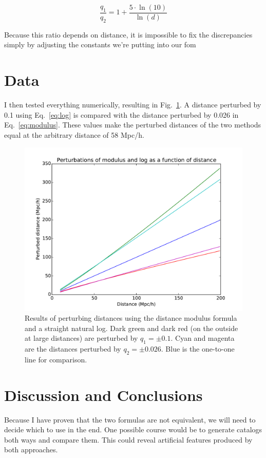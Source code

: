 \documentclass[usenatbib]{mn2e}
\begin{document}
\[
\frac{q_1}{q_2} = 1 + \frac{5\cdot\ln\left(10\right)}{\ln\left(d\right)}
\]

Because this ratio depends on distance, it is impossible to fix the discrepancies simply by adjusting the constants we're putting into our fom



\section{Data}
I then tested everything numerically, resulting in Fig.~\ref{fig:distances}. A distance perturbed by 0.1 using Eq.~\ref{eq:log} is compared with the distance perturbed by 0.026 in Eq.~\ref{eq:modulus}. These values make the perturbed distances of the two methods equal at the arbitrary distance of 58 Mpc/h.
\begin{figure}
  \begin{center}
  \includegraphics[scale=0.4]{moduluses.pdf}
  \end{center}
\caption{\small
Results of perturbing distances using the distance modulus formula and a straight natural log. Dark green and dark red (on the outside at large distances) are perturbed by $q_1 = \pm 0.1$. Cyan and magenta are the distances perturbed by $q_2 = \pm0.026$. Blue is the one-to-one line for comparison. 
}
\label{fig:distances}
\end{figure}

\section{Discussion and Conclusions}

Because I have proven that the two formulas are not equivalent, we will need to decide which to use in the end. One possible course would be to generate catalogs both ways and compare them. This could reveal artificial features produced by both approaches.



\end{document}
